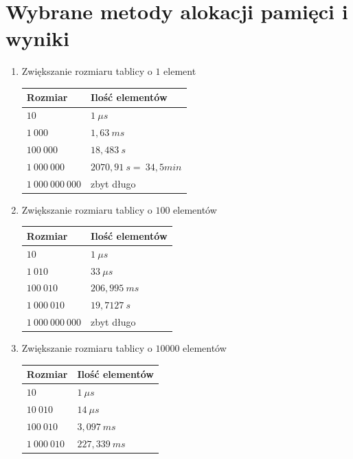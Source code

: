 \documentclass[11pt, a4paper]{article}
\begin{document}
\section{Wybrane metody alokacji pamięci i wyniki}

\begin{enumerate}
	\item Zwiększanie rozmiaru tablicy o $1$ element
		\begin{center}
		\begin{tabular}{| p{5cm} | p{5cm} |}
			\hline
			Rozmiar & Ilość elementów \\ \hline
			$10$ & $1\ \mu s$ \\ \hline
			$1\ 000$ & $1,63\ ms$ \\ \hline
			$100\ 000$ & $18,483\ s $ \\ \hline
			$1\ 000\ 000$ & $2070,91\ s=~34,5 min$ \\ \hline
			$1\ 000\ 000\ 000$ & zbyt długo \\ \hline
     	\end{tabular}
	\end{center}
	\item Zwiększanie rozmiaru tablicy o $100$ elementów
		\begin{center}
		\begin{tabular}{| p{5cm} | p{5cm} |}
			\hline
			Rozmiar & Ilość elementów \\ \hline
			$10$ & $1\ \mu s$ \\ \hline
 			$1\ 010$ & $33\ \mu s$ \\ \hline
			$100\ 010$ & $206,995\ ms$ \\ \hline
        		$1\ 000\ 010$ & $19,7127\ s$ \\ \hline
			$1\ 000\ 000\ 000$ & zbyt długo \\ \hline
	    \end{tabular}
	    \end{center}
	\item Zwiększanie rozmiaru tablicy o $10 000$ elementów
		\begin{center}
		\begin{tabular}{| p{5cm} | p{5cm} |}
			\hline
			Rozmiar & Ilość elementów \\ \hline
			$10$ & $1\ \mu s$ \\ \hline
          	$10\ 010$ & $14\ \mu s$ \\ \hline
 			$100\ 010$ & $3,097\ ms$ \\ \hline
        		$1\ 000\ 010$ & $227,339\ ms$ \\ \hline

\end{tabular}
\end{center}
\end{enumerate}
\end{document}
